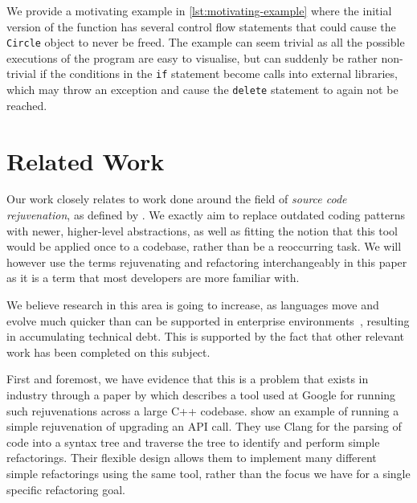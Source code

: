 \documentclass{mpaper}
\begin{document}
    We provide a motivating example in \autoref{lst:motivating-example} where the initial version of the function has several control flow statements that could cause the \texttt{Circle} object to never be freed.
    The example can seem trivial as all the possible executions of the program are easy to visualise, but can suddenly be rather non-trivial if the conditions in the \texttt{if} statement become calls into external libraries, which may throw an exception and cause the \texttt{delete} statement to again not be reached.

    


    \section{Related Work}\label{sec:related-work}
    
    Our work closely relates to work done around the field of \emph{source code rejuvenation}, as defined by \citet{Pirkelbauer2010}. 
    We exactly aim to replace outdated coding patterns with newer, higher-level abstractions, as well as fitting the notion that this tool would be applied once to a codebase, rather than be a reoccurring task.
    We will however use the terms rejuvenating and refactoring interchangeably in this paper as it is a term that most developers are more familiar with.
    
    We believe research in this area is going to increase, as languages move and evolve much quicker than can be supported in enterprise environments~\cite{Overbey2009, Favre2005}, resulting in accumulating technical debt. 
    This is supported by the fact that other relevant work has been completed on this subject.
    
    First and foremost, we have evidence that this is a problem that exists in industry through a paper by \citet{Wright2013} which describes a tool used at Google for running such rejuvenations across a large C++ codebase. 
    \citet{Wright2013} show an example of running a simple rejuvenation of upgrading an API call.
    They use Clang for the parsing of code into a syntax tree and traverse the tree to identify and perform simple refactorings.
    Their flexible design allows them to implement many different simple refactorings using the same tool, rather than the focus we have for a single specific refactoring goal.
\end{document}
